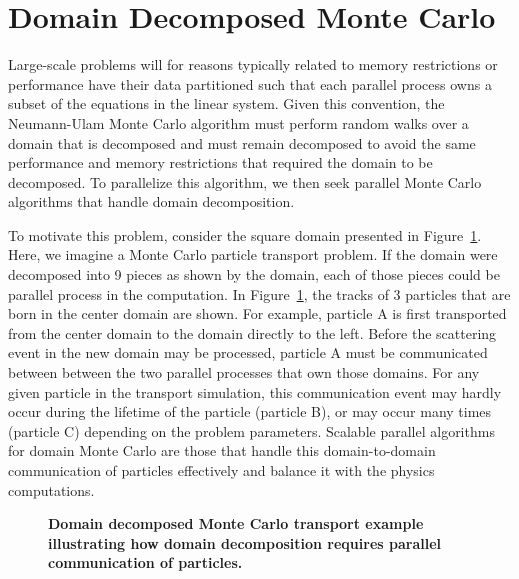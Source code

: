 \section{Domain Decomposed Monte Carlo}
\label{sec:msod}
Large-scale problems will for reasons typically related to memory
restrictions or performance have their data partitioned such that each
parallel process owns a subset of the equations in the linear
system. Given this convention, the Neumann-Ulam Monte Carlo algorithm
must perform random walks over a domain that is decomposed and must
remain decomposed to avoid the same performance and memory
restrictions that required the domain to be decomposed. To parallelize
this algorithm, we then seek parallel Monte Carlo algorithms that
handle domain decomposition.

To motivate this problem, consider the square domain presented in
Figure~\ref{fig:ddmc_example}. Here, we imagine a Monte Carlo particle
transport problem. If the domain were decomposed into 9 pieces as
shown by the domain, each of those pieces could be parallel process in
the computation. In Figure~\ref{fig:ddmc_example}, the tracks of 3
particles that are born in the center domain are shown. For example,
particle A is first transported from the center domain to the domain
directly to the left. Before the scattering event in the new domain
may be processed, particle A must be communicated between between the
two parallel processes that own those domains. For any given particle
in the transport simulation, this communication event may hardly occur
during the lifetime of the particle (particle B), or may occur many
times (particle C) depending on the problem parameters. Scalable
parallel algorithms for domain Monte Carlo are those that handle this
domain-to-domain communication of particles effectively and balance it
with the physics computations.
\begin{figure}[t!]
  \begin{center}
    \scalebox{1.5}{
       }
  \end{center}
  \caption{\textbf{Domain decomposed Monte Carlo transport example
      illustrating how domain decomposition requires parallel
      communication of particles.}}
  \label{fig:ddmc_example}
\end{figure}

